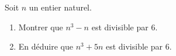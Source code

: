 Soit $n$ un entier naturel.

\begin{enumerate}
  \item Montrer que $n^3 - n$ est divisible par $6$.
  \item En déduire que $n^3 + 5n$ est divisible par $6$.
\end{enumerate}
